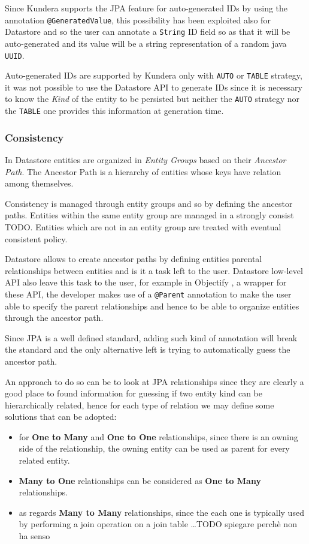\noindent Since Kundera supports the JPA feature for auto-generated IDs by using the annotation \texttt{@GeneratedValue}, this possibility has been exploited also for Datastore and so the user can annotate a \texttt{String} ID field so as that it will be auto-generated and its value will be a string representation of a random java \texttt{UUID}.

\noindent Auto-generated IDs are supported by Kundera only with \texttt{AUTO} or \texttt{TABLE} strategy, it was not possible to use the Datastore API to generate IDs since it is necessary to know the \textit{Kind} of the entity to be persisted but neither the \texttt{AUTO} strategy nor the \texttt{TABLE} one provides this information at generation time.

\subsubsection{Consistency}
In Datastore entities are organized in \textit{Entity Groups} based on their \textit{Ancestor Path}. The Ancestor Path is a hierarchy of entities whose keys have relation among themselves.

\noindent Consistency is managed through entity groups and so by defining the ancestor paths. Entities within the same entity group are managed in a strongly consist TODO. Entities which are not in an entity group are treated with eventual consistent policy.

\noindent Datastore allows to create ancestor paths by defining entities parental relationships between entities and is it a task left to the user. Datastore low-level API also leave this task to the user, for example in Objectify \cite{online:objectify}, a wrapper for these API, the developer makes use of a \texttt{@Parent} annotation to make the user able to specify the parent relationships and hence to be able to organize entities through the ancestor path.

\noindent Since JPA is a well defined standard, adding such kind of annotation will break the standard and the only alternative left is trying to automatically guess the ancestor path.

\noindent An approach to do so can be to look at JPA relationships since they are clearly a good place to found information for guessing if two entity kind can be hierarchically related, hence for each type of relation we may define some solutions that can be adopted:
\begin{itemize}
\item for \textbf{One to Many} and \textbf{One to One} relationships, since there is an owning side of the relationship, the owning entity can be used as parent for every related entity. 
\item \textbf{Many to One} relationships can be considered as \textbf{One to Many} relationships. 
\item as regards \textbf{Many to Many} relationships, since the each one is typically used by performing a join operation on a join table \dots TODO spiegare perchè non ha senso
\end{itemize}

